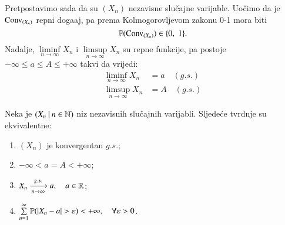 Pretpostavimo sada da su $(X_n)$ nezavisne slu\v cajne varijable.
Uo\v cimo da je $\mathrm{Conv}_{(X_n)}$ repni doga\dj aj, pa prema Kolmogorovljevom zakonu 0-1 mora biti
\begin{equation}    \label{jed:11.7}
    \mathbb{P}({\mathrm{Conv}_{(X_n)}}) \in \{ 0, \; 1 \}.
\end{equation}
Nadalje, $\liminf\limits_{n \to \infty} X_n$ i $\limsup\limits_{n \to \infty} X_n$ su repne funkcije, pa postoje $- \infty \leq a \leq A \leq +\infty$ takvi da vrijedi:
\begin{equation}    \label{jed:11.8}
    \begin{aligned}
        \liminf\limits_{n \to \infty} X_n &= a \quad (g.s.)\\
        \limsup\limits_{n \to \infty} X_n &= A \quad (g.s.)
    \end{aligned}
\end{equation}

\begin{tm}  \label{tm:11.9}
    Neka je $({X_n} \: | \: {n \in \mathbb{N}})$ niz nezavisnih slu\v cajnih varijabli.
    Sljede\' ce tvrdnje su ekvivalentne:
    \begin{enumerate}[label=(\roman*)]
        \item   \label{tm:11.9.1}
        $(X_n)$ je konvergentan $g.s.$;
        \item   \label{tm:11.9.2}
        $-\infty < a = A < +\infty$;
        \item   \label{tm:11.9.3}
        $X_n \xrightarrow[n \to \infty]{g.s.} a, \quad a \in \mathbb{R}$;
        \item   \label{tm:11.9.4}
        $\sum\limits_{n = 1}^{\infty} \mathbb{P}({|X_n - a| > \varepsilon}) < +\infty, \quad \forall \varepsilon > 0$.
    \end{enumerate}
\end{tm}

